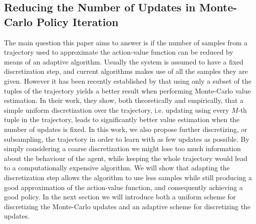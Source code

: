 \subsection{Reducing the Number of Updates in Monte-Carlo Policy Iteration}
The main question this paper aims to answer is if the number of samples from a trajectory used to approximate the action-value function can be reduced by means of an adaptive algorithm. Usually the system is assumed to have a fixed discretization step, and current algorithms makes use of all the samples they are given. However it has been recently established by \cite{zhang2024managing} that using only a subset of the tuples of the trajectory yields a better result when performing Monte-Carlo value estimation. In their work, they show, both theoretically and empirically, that a simple uniform discretization over the trajectory, i.e. updating using every $M$-th tuple in the trajectory, leads to significantly better value estimation when the number of updates is fixed. In this work, we also propose further discretizing, or subsampling, the trajectory in order to learn with as few updates as possible. By simply considering a coarse discretization we might lose too much information about the behaviour of the agent, while keeping the whole trajectory would lead to a computationally expensive algorithm. We will show that adapting the discretization step allows the algorithm to use less samples while still producing a good approximation of the action-value function, and consequently achieving a good policy. In the next section we will introduce both a uniform scheme for discretizing the Monte-Carlo updates and an adaptive scheme for discretizing the updates.



